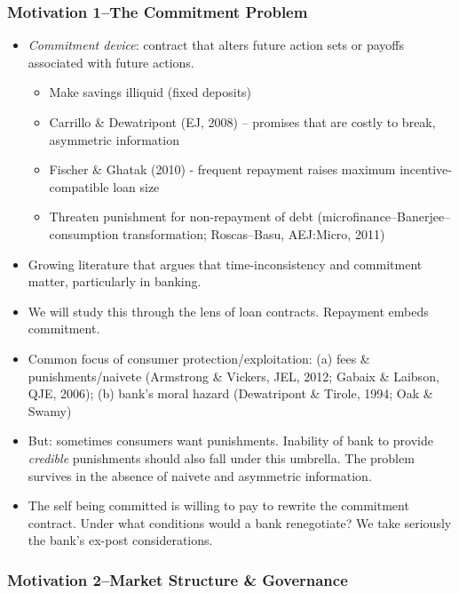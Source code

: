 \documentclass[11pt]{article}%
\begin{document}
\bigskip%

\frametitle{Motivation 1--The Commitment Problem}



\begin{itemize}
\item \textit{Commitment device}: contract that alters future action sets or
payoffs associated with future actions.

\begin{itemize}
\item Make savings illiquid (fixed deposits)

\item Carrillo \& Dewatripont (EJ, 2008) -- promises that are costly to break,
asymmetric information

\item Fischer \& Ghatak (2010) - frequent repayment raises maximum
incentive-compatible loan size

\item Threaten punishment for non-repayment of debt
(microfinance--Banerjee--consumption transformation; Roscas--Basu, AEJ:Micro, 2011)
\end{itemize}

\item Growing literature that argues that time-inconsistency and commitment
matter, particularly in banking.

\item We will study this through the lens of loan contracts. Repayment embeds commitment.

\item Common focus of consumer protection/exploitation: (a) fees \&
punishments/naivete (Armstrong \& Vickers, JEL, 2012; Gabaix \& Laibson, QJE,
2006); (b) bank's moral hazard (Dewatripont \& Tirole, 1994; Oak \& Swamy)

\item But: sometimes consumers want punishments. Inability of bank to provide
\textit{credible} punishments should also fall under this umbrella. The
problem survives in the absence of naivete and asymmetric information.

\item The self being committed is willing to pay to rewrite the commitment
contract. Under what conditions would a bank renegotiate? We take seriously
the bank's ex-post considerations.
\end{itemize}

\bigskip

\frametitle{Motivation 2--Market Structure \& Governance}%
\end{document}
